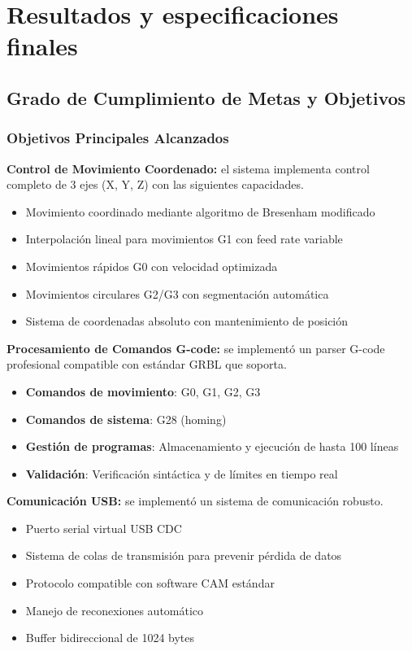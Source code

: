 \documentclass[12pt]{article}
\begin{document}
\section{Resultados y especificaciones finales}

\subsection{Grado de Cumplimiento de Metas y Objetivos}

\subsubsection{Objetivos Principales Alcanzados}

\textbf{Control de Movimiento Coordenado:} el sistema implementa control completo de 3 ejes (X, Y, Z) con las siguientes capacidades.
\begin{itemize}
    \item Movimiento coordinado mediante algoritmo de Bresenham modificado
    \item Interpolación lineal para movimientos G1 con feed rate variable
    \item Movimientos rápidos G0 con velocidad optimizada
    \item Movimientos circulares G2/G3 con segmentación automática
    \item Sistema de coordenadas absoluto con mantenimiento de posición
\end{itemize}

\textbf{Procesamiento de Comandos G-code:} se implementó un parser G-code profesional compatible con estándar GRBL que soporta.
\begin{itemize}
    \item \textbf{Comandos de movimiento}: G0, G1, G2, G3
    \item \textbf{Comandos de sistema}: G28 (homing)
    \item \textbf{Gestión de programas}: Almacenamiento y ejecución de hasta 100 líneas
    \item \textbf{Validación}: Verificación sintáctica y de límites en tiempo real
\end{itemize}

\textbf{Comunicación USB:} se implementó un sistema de comunicación robusto.
\begin{itemize}
    \item Puerto serial virtual USB CDC
    \item Sistema de colas de transmisión para prevenir pérdida de datos
    \item Protocolo compatible con software CAM estándar
    \item Manejo de reconexiones automático
    \item Buffer bidireccional de 1024 bytes
\end{itemize}
\end{document}
